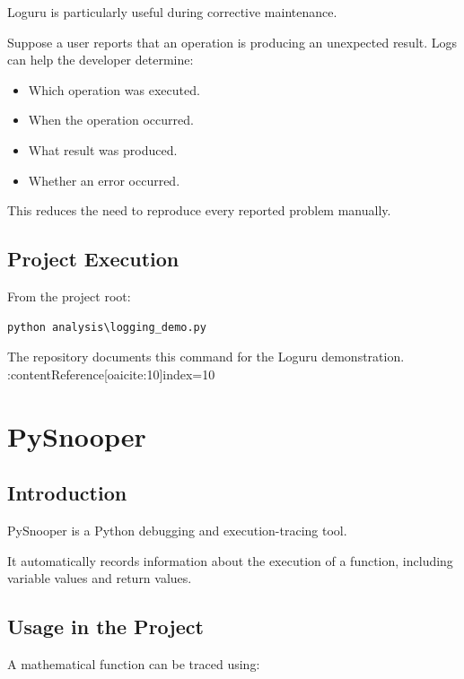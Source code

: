 \documentclass[12pt,a4paper]{report}
\begin{document}
Loguru is particularly useful during corrective maintenance.

Suppose a user reports that an operation is producing an unexpected
result. Logs can help the developer determine:

\begin{itemize}
    \item Which operation was executed.
    \item When the operation occurred.
    \item What result was produced.
    \item Whether an error occurred.
\end{itemize}

This reduces the need to reproduce every reported problem manually.

\section{Project Execution}

From the project root:

\begin{lstlisting}
python analysis\logging_demo.py
\end{lstlisting}

The repository documents this command for the Loguru demonstration. :contentReference[oaicite:10]{index=10}


\chapter{PySnooper}

\section{Introduction}

PySnooper is a Python debugging and execution-tracing tool.

It automatically records information about the execution of a
function, including variable values and return values.

\section{Usage in the Project}

A mathematical function can be traced using:
\end{document}
